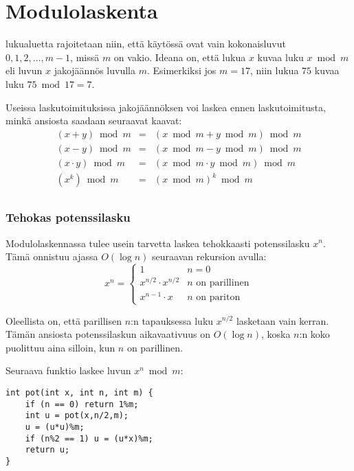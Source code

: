 \section{Modulolaskenta}


 lukualuetta rajoitetaan
niin, että käytössä ovat vain
kokonaisluvut $0,1,2,\ldots,m-1$,
missä $m$ on vakio.
Ideana on, että lukua $x$ kuvaa luku $x \bmod m$
eli luvun $x$ jakojäännös luvulla $m$.
Esimerkiksi jos $m=17$, niin lukua $75$ kuvaa luku
$75 \bmod 17 = 7$.

Useissa laskutoimituksissa jakojäännöksen voi laskea
ennen laskutoimitusta, minkä ansiosta saadaan seuraavat kaavat:
\[
\begin{array}{rcl}
(x+y) \bmod m & = & (x \bmod m + y \bmod m) \bmod m \\
(x-y) \bmod m & = & (x \bmod m - y \bmod m) \bmod m \\
(x \cdot y) \bmod m & = & (x \bmod m \cdot y \bmod m) \bmod m \\
(x^k) \bmod m & = & (x \bmod m)^k \bmod m \\
\end{array}
\]

\subsubsection{Tehokas potenssilasku}

Modulolaskennassa tulee usein tarvetta laskea
tehokkaasti potenssilasku $x^n$.
Tämä onnistuu ajassa $O(\log n)$
seuraavan rekursion avulla:
\begin{equation*}
    x^n = \begin{cases}
               1        & n = 0\\
               x^{n/2} \cdot x^{n/2} & \text{$n$ on parillinen}\\
               x^{n-1} \cdot x & \text{$n$ on pariton}
           \end{cases}
\end{equation*}

Oleellista on, että parillisen $n$:n
tapauksessa luku $x^{n/2}$ lasketaan vain kerran.
Tämän ansiosta potenssilaskun aikavaativuus on $O(\log n)$,
koska $n$:n koko puolittuu aina silloin,
kun $n$ on parillinen.

Seuraava funktio laskee luvun $x^n \bmod m$:

\begin{lstlisting}
int pot(int x, int n, int m) {
    if (n == 0) return 1%m;
    int u = pot(x,n/2,m);
    u = (u*u)%m;
    if (n%2 == 1) u = (u*x)%m;
    return u;
}
\end{lstlisting}

